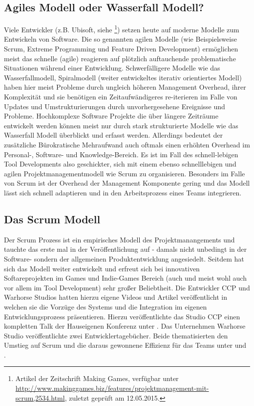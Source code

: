 \documentclass[pagesize, paper=a4, fontsize=12pt, titlepage=true, headings=small, headnosepline, abstractoff, liststotoc, nochapterprefix, plainheadsepline, twoside]{scrreprt}
\begin{document}
\subsection{Agiles Modell oder Wasserfall Modell?}
Viele Entwickler (z.B. Ubisoft, siehe \cite{MKG:Schmitz2014}\footnote{Artikel der Zeitschrift Making Games, verfügbar unter \url{http://www.makinggames.biz/features/projektmanagement-mit-scrum,2534.html}, zuletzt geprüft am 12.05.2015.}) setzen heute auf moderne Modelle zum Entwickeln von Software. Die so genannten agilen Modelle (wie Beispielsweise Scrum,  Extreme Programming und Feature Driven Development) ermöglichen meist das schnelle (agile) reagieren auf plötzlich auftauchende problematische Situationen während einer Entwicklung. Schwerfälligere Modelle wie das Wasserfallmodell, Spiralmodell (weiter entwickeltes iterativ orientiertes Modell) haben hier meist Probleme durch ungleich höheren Management Overhead, ihrer Komplexität und sie benötigen ein Zeitaufwändigeres re-iterieren im Falle von Updates und Umstrukturierungen durch unvorhergesehene Ereignisse und Probleme. Hochkomplexe Software Projekte die über längere Zeiträume entwickelt werden können meist nur durch stark strukturierte Modelle wie das Wasserfall Modell überblickt und erfasst werden. Allerdings bedeutet der zusätzliche Bürokratische Mehraufwand auch oftmals einen erhöhten Overhead im Personal-, Software- und Knowledge-Bereich. Es ist im Fall des schnell-lebigen Tool Developments also geschickter, sich mit einem ebenso schnelllebigen und agilen Projektmanagementmodell wie Scrum zu organisieren. Besonders im Falle von Scrum ist der Overhead der Management Komponente gering und das Modell lässt sich schnell adaptieren und in den Arbeitsprozess eines Teams integrieren.

\subsection{Das Scrum Modell}
Der Scrum Prozess ist ein empirisches Modell des Projektmanangements und tauchte das erste mal in der Veröffentlichung  auf - damals nicht unbedingt in der Software- sondern der allgemeinen Produktentwicklung angesiedelt. Seitdem hat sich das Modell weiter entwickelt und erfreut sich bei innovativen Softareprojekten im Games und Indie-Games Bereich (auch und meist wohl auch vor allem im Tool Development) sehr großer Beliebtheit. Die Entwickler CCP und Warhorse Studios hatten hierzu eigene Videos und Artikel veröffentlicht in welchen sie die Vorzüge des Systems und die Integration im eigenen Entwicklungsprozess präsentieren. Hierzu veröffentlichte das Studio CCP einen kompletten Talk der Hauseigenen Konferenz unter .  Das Unternehmen Warhorse Studio veröffentlichte zwei Entwicklertagebücher. Beide thematisierten den Umstieg auf Scrum und die daraus gewonnene Effizienz für das Teams unter  und .
\end{document}

